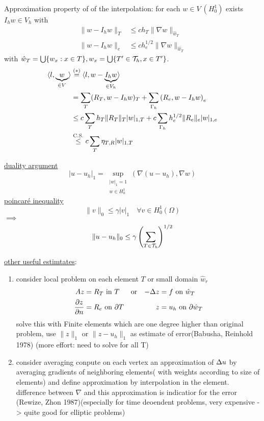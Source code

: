 Approximation property of of the interpolation:\nl
for each $w\in V\ (H^1_0)$ exists $I_hw\in V_h$ with 
\begin{align*}
	\|w-I_hw\|_T &\leq c h_T \|\nabla w\|_{\hat{w}_T}\\
	\|w-I_hw\|_e &\leq c h^{1/2}_e \|\nabla w\|_{\hat{w}_T}
\end{align*}
with $\hat{w}_T = \bigcup\{w_x:x\in T\}, w_x = \bigcup \{T'\in\mathcal{T}_h,x\in T'\}$.
\begin{align*}
	\langle l,\underbrace{w}_{\in V} \rangle &\stackrel{(*)}{=} \langle l,w-\underbrace{I_hw}_{\in V_h} \rangle\\
	&= \sum \limits_T  (R_T,w-I_hw)_T + \sum \limits_{\Gamma_h} \left(R_e,w-I_hw\right)_e\\
	&\leq c\sum \limits_T h_T  \|R_T\|_T |w|_{1,T} + c\sum \limits_{\Gamma_h} h^{1/2}_e \|R_e\|_e |w|_{1,e}\\
	&\stackrel{\text{C.S.}}{\leq} c\sum \limits_T \eta_{T,R} |w|_{1,T}
\end{align*}

\underline{duality argument}
\begin{equation*}
	|u-u_h|_1 = \underset{\substack{|w|_1=1 \\w\in H^1_0}}{\sup} ( \nabla(u-u_h),\nabla w)
\end{equation*}
\underline{poincaré inequality}
\begin{equation*}
	\|v\|_0 \leq \gamma |v|_1 \quad \forall v \in H^1_0(\Omega)
\end{equation*}
$\implies$
\begin{equation*}
	\|u-u_h\|_0 \leq \gamma \left( \sum \limits_{T \in \mathcal{T}_h}\right)^{1/2}
\end{equation*}

\underline{other useful estimtates}:
\begin{enumerate}[label= (\alph*)]
	\item consider local problem on each element $T$ or small domain $\hat{w}_r$ 
	\begin{align*}
		Az &= R_T \text{ in } T  &&\text{or}& -\Delta z&= f \text{ on } \hat{w}_T\\
		\frac{\partial z}{\partial n} &= R_e \text{ on } \partial T  &&& z &= u_h \text{ on } \partial \hat{w}_T
	\end{align*}
	solve this with Finite elements which are one degree higher than original problem, use $\|z\|_1$ or $\|z-u_h\|_1$ as estimate of error(Babusha, Reinhold 1978) (more effort: need to solve for all T)
	\item consider averaging\nl
	conpute on each vertex an approximation of $\Delta u$ by averaging gradients of neighboring elements( with weights according to size of elements) and define approximation by interpolation in the element.\nl
	difference between $\nabla $ and this approximation is indicatior for the error (Rewize, Zhon 1987)(especially for time deoendent problems, very expensive -> quite good for elliptic problems)
\end{enumerate}
